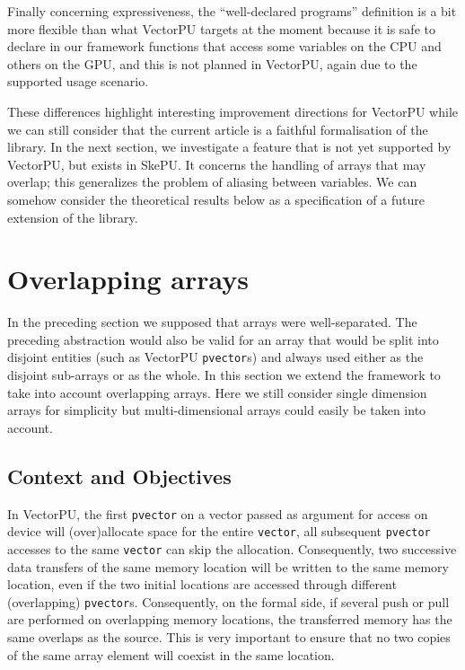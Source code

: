 \documentclass[preprint,12pt]{elsarticle}
\begin{document}
Finally concerning expressiveness, the ``well-declared programs'' definition is a bit more flexible than what VectorPU targets at the moment because it is safe to declare in our framework functions that access some variables on the CPU and others on the GPU, and this is not planned in VectorPU, again due to the supported usage scenario.

These differences highlight interesting improvement directions for VectorPU while we can still consider that the current article  is a faithful formalisation of the library. In the next section, we investigate a feature that is not yet supported by VectorPU, but exists in SkePU. It concerns the handling of arrays that may overlap; this generalizes the problem of  aliasing between variables.
 We can somehow consider the theoretical results below as a specification of a future extension of the library.

\section{Overlapping arrays}\label{sec:overlap-array}

In the preceding section we supposed that arrays were well-separated. The preceding abstraction would also be valid for an array that would be split into disjoint entities (such as
VectorPU \texttt{pvector}s) and always used either as the disjoint sub-arrays or as the whole. In this section we extend the framework to take into account overlapping arrays. Here we still consider single dimension arrays for simplicity but multi-dimensional arrays could easily be taken into account.

\subsection{Context and Objectives}

In VectorPU, the first \texttt{pvector} on a vector passed as argument for access on device will (over)allocate space for the entire \texttt{vector}, all subsequent \texttt{pvector} accesses to the same \texttt{vector} can skip the allocation.
 Consequently, two successive data transfers of the same memory location will be written to the same memory location, even if the two initial locations are accessed through different (overlapping) \texttt{pvector}s.
Consequently, on the formal side, if several push or pull are performed on overlapping memory locations, the transferred memory has the same overlaps as the source. This is very important to ensure that no two copies of the same array element will coexist in the same location.
\end{document}
